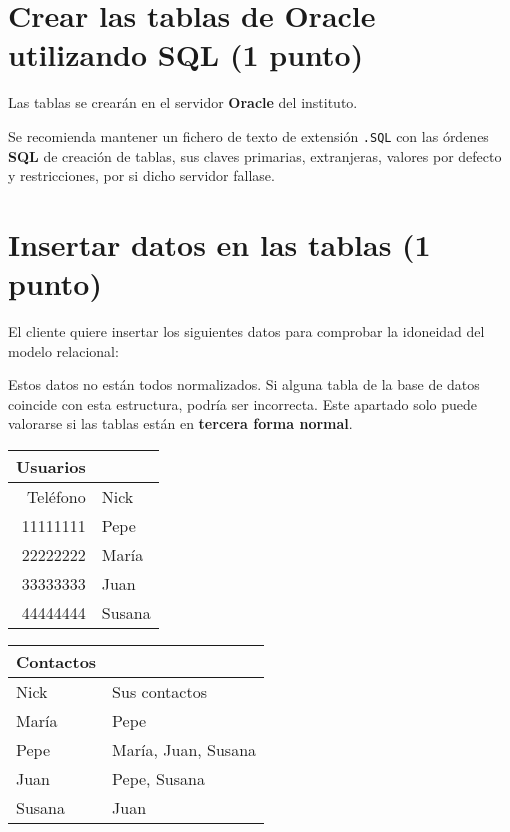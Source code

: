 \documentclass[a4paper]{article}
\begin{document}
\section{Crear las tablas de Oracle utilizando \textbf{SQL} (1 punto)}
\label{sec:org0000009}
Las tablas se crearán en el servidor \textbf{Oracle} del instituto.

Se recomienda mantener un fichero de texto de extensión \texttt{.SQL} con las órdenes \textbf{SQL} de creación de tablas, sus claves primarias, extranjeras, valores por defecto y restricciones, por si dicho servidor fallase.


\section{Insertar datos en las tablas (1 punto)}
\label{sec:org000000c}

El cliente quiere insertar los siguientes datos para comprobar la idoneidad del modelo relacional:

\begin{Aviso}
Estos datos no están todos normalizados. Si alguna tabla de la base de datos coincide con esta estructura, podría ser incorrecta.
Este apartado solo puede valorarse si las tablas están en \textbf{tercera forma normal}.
\end{Aviso}

\begin{center}
\begin{tabular}{|r|l|}
\hline
\textbf{Usuarios} & \\[0pt]
\hline
Teléfono & Nick\\[0pt]
\hline
11111111 & Pepe\\[0pt]
22222222 & María\\[0pt]
33333333 & Juan\\[0pt]
44444444 & Susana\\[0pt]
\hline
\end{tabular}
\begin{tabular}{|l|l|}
\hline
\textbf{Contactos} & \\[0pt]
\hline
Nick & Sus contactos\\[0pt]
\hline
María & Pepe\\[0pt]
Pepe & María, Juan, Susana\\[0pt]
Juan & Pepe, Susana\\[0pt]
Susana & Juan\\[0pt]
\hline
\end{tabular}
\end{center}
\end{document}
